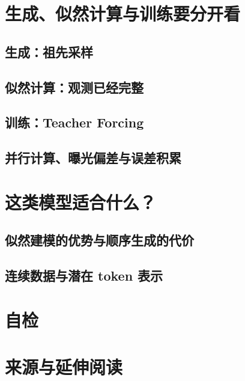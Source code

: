\section{生成、似然计算与训练要分开看}
\label{sec:ar-computation}
\contentplaceholder

\subsection{生成：祖先采样}
\label{subsec:ar-generation}
\contentplaceholder

\subsection{似然计算：观测已经完整}
\label{subsec:ar-likelihood}
\contentplaceholder

\subsection{训练：Teacher Forcing}
\label{subsec:ar-teacher-forcing}
\contentplaceholder

\subsection{并行计算、曝光偏差与误差积累}
\label{subsec:ar-parallelism}
\contentplaceholder

\section{这类模型适合什么？}
\label{sec:ar-strengths-limits}
\contentplaceholder

\subsection{似然建模的优势与顺序生成的代价}
\label{subsec:ar-tradeoffs}
\contentplaceholder

\subsection{连续数据与潜在 token 表示}
\label{subsec:ar-representations}
\contentplaceholder

\section{自检}
\label{sec:ar-review}
\contentplaceholder

\section{来源与延伸阅读}
\label{sec:ar-reading}
\contentplaceholder
